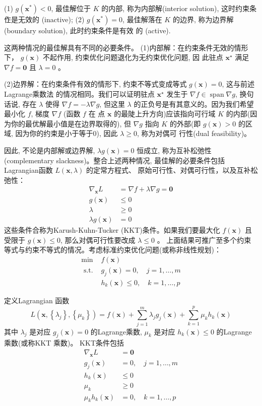 (1) $ g\left(\mathbf{x}^{*}\right)<0 $, 最佳解位于 $ K $ 的内部, 称为内部解(interior solution), 这时约束条㑅是无效的 (inactive);
(2) $ g\left(\mathbf{x}^{*}\right)=0 $, 最佳解落在 $ K $ 的边界, 称为边界解(boundary solution), 此时约束条件是有效 的 (active).

这两种情况的最佳解具有不同的必要条件。
(1)内部解：在约束条件无效的情形下， $ g(\mathbf{x}) $ 不起作用, 约束优化问题退化为无约束优化问题, 因 此驻点 $ \mathbf{x}^{\star} $ 满足 $ \nabla f=\mathbf{0} $ 且 $ \lambda=0 $ 。

(2)边界解：在约束条件有效的情形下, 约束不等式变成等式 $g(\mathbf{x})=0$, 这与前述Lagrange乘数法 的情况相同。我们可以证明驻点 $\mathbf{x}^{\star}$ 发生于 $\nabla f \in \operatorname{span} \nabla g$, 换句话说, 存在 $\lambda$ 使得 $\nabla f=-\lambda \nabla g$, 但这里 $\lambda$ 的正负号是有其意义的。因为我们希望最小化 $f$, 梯度 $\nabla f$ (函数 $f$ 在 点 $\mathbf{x}$ 的最陡上升方向)应该指向可行域 $K$ 的内部(因为你的最优解最小值是在边界取得的), 但 $\nabla g$ 指向 $K$ 的外部(即 $g(\mathbf{x})>0$ 的区域, 因为你的约束是小于等于0), 因此 $\lambda \geq 0$, 称为对偶可 行性(dual feasibility)。

因此, 不论是内部解或边界解, $\lambda g(\mathbf{x})=0$ 恒成立, 称为互补松弛性(complementary slackness)。整合上述两种情况, 最佳解的必要条件包括Lagrangian函数 $L(\mathbf{x}, \lambda)$ 的定常方程式、 原始可行性、对偶可行性，以及互补松弛性：
$$
\begin{aligned}
\nabla_{\mathbf{x}} L &=\nabla f+\lambda \nabla g=\mathbf{0} \\
g(\mathbf{x}) & \leq 0 \\
\lambda & \geq 0 \\
\lambda g(\mathbf{x}) &=0
\end{aligned}
$$
这些条件合称为Karush-Kuhn-Tucker (KKT)条件。如果我们要最大化 $f(\mathbf{x})$ 且受限于 $g(\mathbf{x}) \leq 0$, 那么对偶可行性要改成 $\lambda \leq 0$ 。
上面结果可推广至多个约束等式与约束不等式的情况。考虑标准约束优化问题(或称非线性规划)：
$$
\begin{array}{ll}
\min & f(\mathbf{x}) \\
\text { s.t. } & g_{j}(\mathbf{x})=0, \quad j=1, \ldots, m \\
& h_{k}(\mathbf{x}) \leq 0, \quad k=1, \ldots, p
\end{array}
$$

定义Lagrangian 函数
$$
L\left(\mathbf{x},\left\{\lambda_{j}\right\},\left\{\mu_{k}\right\}\right)=f(\mathbf{x})+\sum_{j=1}^{m} \lambda_{j} g_{j}(\mathbf{x})+\sum_{k=1}^{p} \mu_{k} h_{k}(\mathbf{x})
$$
其中 $ \lambda_{j} $ 是对应 $ g_{j}(\mathbf{x})=0 $ 的Lagrange乘数, $ \mu_{k} $ 是对应 $ h_{k}(\mathbf{x}) \leq 0 $ 的Lagrange乘数(或称KKT 乘数)。 KKT条件包括
$$
\begin{aligned}
\nabla_{\mathbf{x}} L &=\mathbf{0} \\
g_{j}(\mathbf{x}) &=0, \quad j=1, \ldots, m \\
h_{k}(\mathbf{x}) & \leq 0 \\
\mu_{k} & \geq 0 \\
\mu_{k} h_{k}(\mathbf{x}) &=0, \quad k=1, \ldots, p
\end{aligned}
$$

